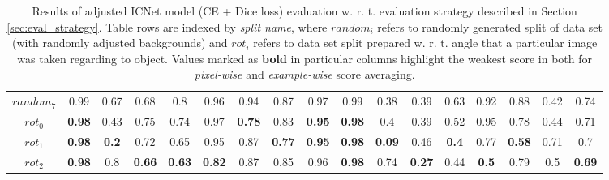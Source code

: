 \documentclass{article}
\begin{document}
\begin{center}
\begin{table}[H]
\begin{tabular}{ |c|c|c|c|c|c|c|c|c||c|c|c|c|c|c|c|c| }
$random_7$ &  0.99 & 0.67 & 0.68 & 0.8 & 0.96 & 0.94 & 0.87 & 0.97 &  0.99 & 0.38 & 0.39 & 0.63 & 0.92 & 0.88 & 0.42 & 0.74 \\ \hhline{|=|=|=|=|=|=|=|=|=|=|=|=|=|=|=|=|=|}  
$rot_0$ &  \textbf{0.98} & 0.43 & 0.75 & 0.74 & 0.97 & \textbf{0.78} & 0.83 & \textbf{0.95} &  \textbf{0.98} & 0.4 & 0.39 & 0.52 & 0.95 & 0.78 & 0.44 & 0.71 \\ \hline 
$rot_1$ &  \textbf{0.98} & \textbf{0.2} & 0.72 & 0.65 & 0.95 & 0.87 & \textbf{0.77} & \textbf{0.95} & \textbf{0.98} & \textbf{0.09} & 0.46 & \textbf{0.4} & 0.77 & \textbf{0.58} & 0.71 & 0.7 \\ \hline 
$rot_2$ &  \textbf{0.98} & 0.8 & \textbf{0.66} & \textbf{0.63} & \textbf{0.82} & 0.87 & 0.85 & 0.96 &  \textbf{0.98} & 0.74 & \textbf{0.27} & 0.44 & \textbf{0.5} & 0.79 & 0.5 & \textbf{0.69} \\ \hline 
\end{tabular}
\caption{Results of adjusted ICNet \cite{icnet} model (CE + Dice loss) evaluation w. r. t. evaluation strategy described in Section \ref{sec:eval_strategy}. Table rows are indexed by \textit{split name}, where $random_i$ refers to randomly generated split of data set (with randomly adjusted backgrounds) and $rot_i$ refers to data set split prepared w. r. t. angle that a particular image was taken regarding to object. Values marked as \textbf{bold} in particular columns highlight the weakest score in both for \textit{pixel-wise} and \textit{example-wise} score averaging.}
\label{tab:icnet_ce_dice_results}
\end{table}
\end{center}
\end{document}

